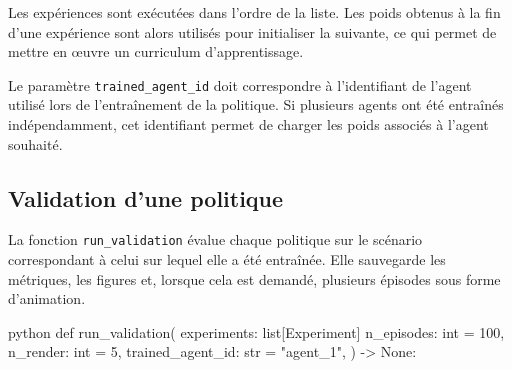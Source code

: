 \noindent Les expériences sont exécutées dans l'ordre de la liste. Les poids obtenus à la fin d'une expérience sont alors utilisés pour initialiser la suivante, ce qui permet de mettre en œuvre un curriculum d'apprentissage.

\begin{tcolorbox}[colback=YellowGreen!5,colframe=YellowGreen,title=Remarque]
    Le paramètre \texttt{trained\_agent\_id} doit correspondre à l'identifiant de l'agent utilisé lors de l'entraînement de la politique. Si plusieurs agents ont été entraînés indépendamment, cet identifiant permet de charger les poids associés à l'agent souhaité.
\end{tcolorbox}

\subsection{Validation d'une politique}

\noindent La fonction \texttt{run\_validation} évalue chaque politique sur le scénario correspondant à celui sur lequel elle a été entraînée. Elle sauvegarde les métriques, les figures et, lorsque cela est demandé, plusieurs épisodes sous forme d'animation.

\begin{codebox}{python}
def run_validation(
    experiments: list[Experiment]
    n_episodes: int = 100,
    n_render: int = 5,
    trained_agent_id: str = "agent_1",
) -> None:
\end{codebox}

